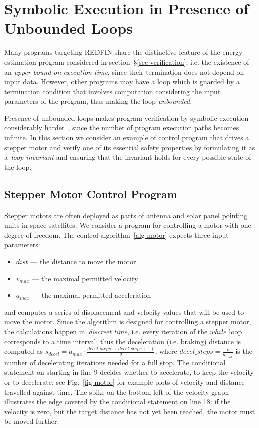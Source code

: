 \section{Symbolic Execution in Presence of Unbounded Loops\label{sec-motor-control}}

Many programs targeting REDFIN share the distinctive feature of
the energy estimation program considered in section~\S\ref{sec-verification},
i.e. the existence of an  \emph{upper bound on execution time},
since their termination does not depend on input data.
However, other programs may have a loop
which is guarded by a termination condition that involves computation
considering the input parameters of the program, thus making the loop
\emph{unbounded}.

Presence of unbounded loops makes program verification by symbolic execution considerably
harder~\cite[p.~50:20]{SurveySymExec-CSUR18}, since the number of program execution
paths becomes infinite. In this section we consider an example
of control program that drives a stepper motor and verify one of its essential
safety properties by formulating it as a~\emph{loop invariant} and ensuring that the
invariant holds for every possible state of the loop.

\subsection{Stepper Motor Control Program}

Stepper motors are often deployed as parts of antenna and solar panel pointing units
in space satellites. We consider a program for controlling a motor with
one degree of freedom. The control algorithm~\ref{alg-motor} expects three input
parameters:
\begin{itemize}
\item $dist$ --- the distance to move the motor
\item $v_{max}$ --- the maximal permitted velocity
\item $a_{max}$ --- the maximal permitted acceleration
\end{itemize}

\noindent
and computes a series of
displacement and velocity values that will be used to move the motor. Since the algorithm is
designed for controlling a stepper motor, the calculations happen in~\emph{discreet time},
i.e. every iteration of the $while$ loop corresponds to a time interval; thus
the deceleration (i.e. braking) distance is computed as
$s_{decel} = a_{max} \cdot \frac{decel\_steps \cdot (decel\_steps + 1)}{2}$, where
$decel\_steps = \frac{v}{a_{max}}$ is the number of decelerating iterations
needed for a full stop. The conditional statement on starting in line 9 decides whether
to accelerate, to keep the velocity or to decelerate;
see Fig.~\ref{fig-motor} for example plots of velocity and distance travelled
against time. The spike on the bottom-left of the velocity graph illustrates
the edge covered by the conditional statement on line 18: if the velocity is zero, but the target
distance has not yet been reached, the motor must be moved further.

